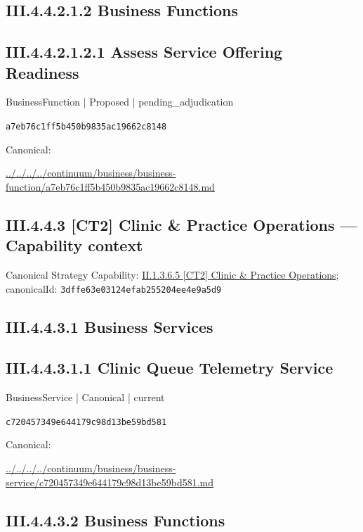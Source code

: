 \documentclass[10pt,a4paper]{article}
\begin{document}
\subsection*{III.4.4.2.1.2 Business Functions}
\subsection*{III.4.4.2.1.2.1 Assess Service Offering Readiness}
\label{element-a7eb76c1ff5b450b9835ac19662c8148}
{\small BusinessFunction | Proposed | pending\_adjudication}\par
\texttt{a7eb76c1ff5b450b9835ac19662c8148}\par
Canonical: \par
{\footnotesize\url{../../../../continuum/business/business-function/a7eb76c1ff5b450b9835ac19662c8148.md}}\par
\subsection*{III.4.4.3 [CT2] Clinic \& Practice Operations — Capability context}
Canonical Strategy Capability: \hyperref[element-3dffe63e03124efab255204ee4e9a5d9]{II.1.3.6.5 [CT2] Clinic \& Practice Operations}; canonicalId: \texttt{3dffe63e03124efab255204ee4e9a5d9}\par
\subsection*{III.4.4.3.1 Business Services}
\subsection*{III.4.4.3.1.1 Clinic Queue Telemetry Service}
\label{element-c720457349e644179c98d13be59bd581}
{\small BusinessService | Canonical | current}\par
\texttt{c720457349e644179c98d13be59bd581}\par
Canonical: \par
{\footnotesize\url{../../../../continuum/business/business-service/c720457349e644179c98d13be59bd581.md}}\par
\subsection*{III.4.4.3.2 Business Functions}
\end{document}
